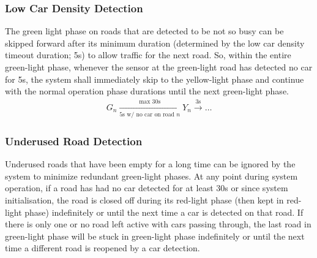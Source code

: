 \subsubsection{Low Car Density Detection}
The green light phase on roads that are detected to be not so busy can be skipped forward after its minimum duration (determined by the low car density timeout duration; 5\si{\second}) to allow traffic for the next road. So, within the entire green-light phase, whenever the sensor at the green-light road has detected no car for 5\unit{\second}, the system shall immediately skip to the yellow-light phase and continue with the normal operation phase durations until the next green-light phase.
\begin{align}
	G_n\xrightarrow[5\unit{\second}\text{ w/ no car on road $n$}]{\text{max }30\unit{\second}}Y_n\xrightarrow{3\unit{\second}}\dots
\end{align}
\subsubsection{Underused Road Detection}
Underused roads that have been empty for a long time can be ignored by the system to minimize redundant green-light phases. At any point during system operation, if a road has had no car detected for at least 30\unit{\second} or since system initialisation, the road is closed off during its red-light phase (then kept in red-light phase) indefinitely or until the next time a car is detected on that road. If there is only one or no road left active with cars passing through, the last road in green-light phase will be stuck in green-light phase indefinitely or until the next time a different road is reopened by a car detection.
